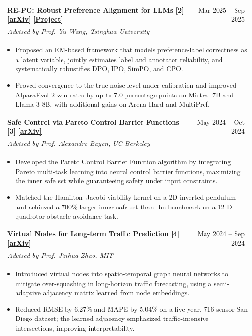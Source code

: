 \documentclass[10pt,letterpaper]{article}
\makeatletter
\newcommand{\research}[3]{%
\begin{tabularx}{\textwidth}{@{}Xr@{}}
\textbf{#1} & #2\\[-0.03em]
\textit{#3} &
\end{tabularx}\vspace{-0.08em}
}
\newcommand{\linktag}[2]{\href{#1}{\normalfont\underline{[#2]}}}
\makeatother
\begin{document}
\newpage

\research{RE-PO: Robust Preference Alignment for LLMs \textnormal{[2]} \linktag{https://arxiv.org/abs/2509.24159}{arXiv} \linktag{https://repo-alignment.github.io/}{Project}}{Mar 2025 -- Sep 2025}{Advised by Prof. Yu Wang, Tsinghua University}
\begin{itemize}[leftmargin=1.45em,labelsep=0.55em,itemsep=0.12em,topsep=0.18em,parsep=0em]
\item Proposed an EM-based framework that models preference-label correctness as a latent variable, jointly estimates label and annotator reliability, and systematically robustifies DPO, IPO, SimPO, and CPO.
\item Proved convergence to the true noise level under calibration and improved AlpacaEval 2 win rates by up to 7.0 percentage points on Mistral-7B and Llama-3-8B, with additional gains on Arena-Hard and MultiPref.
\end{itemize}

\research{Safe Control via Pareto Control Barrier Functions \textnormal{[3]} \linktag{https://arxiv.org/abs/2410.04260}{arXiv}}{May 2024 -- Oct 2024}{Advised by Prof. Alexandre Bayen, UC Berkeley}
\begin{itemize}[leftmargin=1.45em,labelsep=0.55em,itemsep=0.12em,topsep=0.18em,parsep=0em]
\item Developed the Pareto Control Barrier Function algorithm by integrating Pareto multi-task learning into neural control barrier functions, maximizing the inner safe set while guaranteeing safety under input constraints.
\item Matched the Hamilton--Jacobi viability kernel on a 2D inverted pendulum and achieved a 700\% larger inner safe set than the benchmark on a 12-D quadrotor obstacle-avoidance task.
\end{itemize}

\research{Virtual Nodes for Long-term Traffic Prediction \textnormal{[4]} \linktag{https://arxiv.org/abs/2501.10048}{arXiv}}{May 2024 -- Sep 2024}{Advised by Prof. Jinhua Zhao, MIT}
\begin{itemize}[leftmargin=1.45em,labelsep=0.55em,itemsep=0.12em,topsep=0.18em,parsep=0em]
\item Introduced virtual nodes into spatio-temporal graph neural networks to mitigate over-squashing in long-horizon traffic forecasting, using a semi-adaptive adjacency matrix learned from node embeddings.
\item Reduced RMSE by 6.27\% and MAPE by 5.04\% on a five-year, 716-sensor San Diego dataset; the learned adjacency emphasized traffic-intensive intersections, improving interpretability.
\end{itemize}
\end{document}

